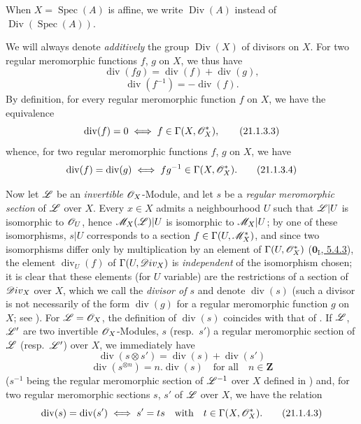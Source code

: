 When $X=\operatorname{Spec}(A)$ is affine, we write $\operatorname{Div}(A)$ instead of $\operatorname{Div}(\operatorname{Spec}(A))$.

\begin{env}[21.1.3]
\label{IV.21.1.3}
We will always denote \emph{additively} the group $\operatorname{Div}(X)$ of divisors on $X$.
For two regular meromorphic functions $f$, $g$ on $X$, we thus have
\[
\label{IV.21.1.3.1}
  \operatorname{div}(fg)=\operatorname{div}(f)+\operatorname{div}(g),
  \tag{21.1.3.1}
\]
\[
\label{IV.21.1.3.2}
  \operatorname{div}(f^{-1})=-\operatorname{div}(f).
  \tag{21.1.3.2}
\]
By definition, for every regular meromorphic function $f$ on $X$, we have the equivalence
\[
\label{IV.21.1.3.3}
  \operatorname{div}(f)=0 \iff f\in\Gamma(X,\mathscr{O}_X^*),
  \tag{21.1.3.3}
\]
whence, for two regular meromorphic functions $f$, $g$ on $X$, we have
\[
\label{IV.21.1.3.4}
  \operatorname{div}(f)=\operatorname{div}(g) \iff fg^{-1}\in\Gamma(X,\mathscr{O}_X^*).
  \tag{21.1.3.4}
\]
\end{env}

\begin{env}[21.1.4]
\label{IV.21.1.4}
Now let $\mathscr{L}$ be an \emph{invertible} $\mathscr{O}_X$-Module, and let $s$ be a \emph{regular meromorphic section}  of $\mathscr{L}$ over $X$.
Every $x\in X$ admits a neighbourhood $U$ such that $\mathscr{L}|U$ is isomorphic to $\mathscr{O}_U$, hence $\mathscr{M}_X(\mathscr{L})|U$ is isomorphic to $\mathscr{M}_X|U$;
by one of these isomorphisms, $s|U$ corresponds to a section $f\in\Gamma(U,\mathscr{M}_X^*)$, and since two isomorphisms differ only by multiplication by an element of $\Gamma(U,\mathscr{O}_X^*)$ (\hyperref[0.5.4.3]{$\mathbf{0}_{\mathrm{I}}$, 5.4.3}), the element $\operatorname{div}_U(f)$ of $\Gamma(U,\mathscr{D}iv_X)$ is \emph{independent} of the isomorphism chosen;
it is clear that these elements (for $U$ variable) are the restrictions of a section of $\mathscr{D}iv_X$ over $X$, which we call the \emph{divisor of $s$} and denote $\operatorname{div}(s)$ (such a divisor is not necessarily of the form $\operatorname{div}(g)$ for a regular meromorphic function $g$ on $X$;
see ).
For $\mathscr{L}=\mathscr{O}_X$, the definition of $\operatorname{div}(s)$ coincides with that of .
If $\mathscr{L}$, $\mathscr{L}'$ are two invertible $\mathscr{O}_X$-Modules, $s$ (resp.\ $s'$) a regular meromorphic section of $\mathscr{L}$ (resp.\ $\mathscr{L}'$) over $X$, we immediately have
\[
\label{IV.21.1.4.1}
  \operatorname{div}(s\otimes s')=\operatorname{div}(s)+\operatorname{div}(s')
  \tag{21.1.4.1}
\]
\[
\label{IV.21.1.4.2}
  \operatorname{div}(s^{\otimes n})=n.\operatorname{div}(s) \quad\text{for all}\quad n\in\mathbf{Z}
  \tag{21.1.4.2}
\]
($s^{-1}$ being the regular meromorphic section of $\mathscr{L}^{-1}$ over $X$ defined in )
and, for two regular meromorphic sections $s$, $s'$ of $\mathscr{L}$ over $X$, we have the relation
\[
\label{IV.21.1.4.3}
  \operatorname{div}(s)=\operatorname{div}(s') \iff s'=ts \quad\text{with}\quad t\in\Gamma(X,\mathscr{O}_X^*).
  \tag{21.1.4.3}
\]
\end{env}

